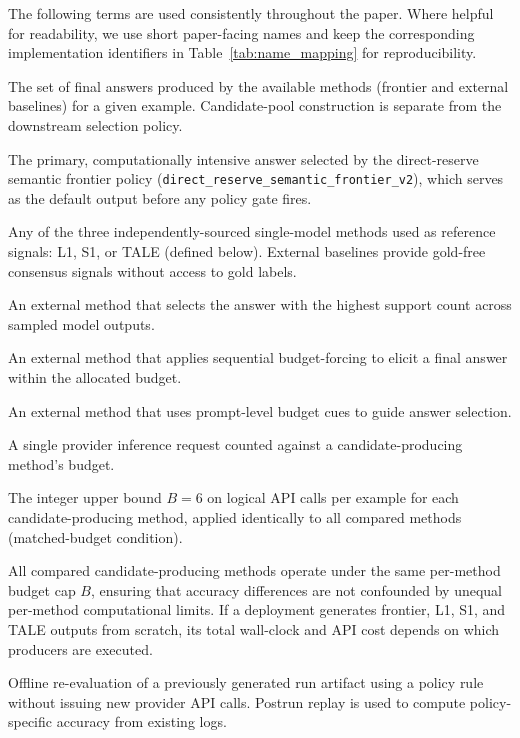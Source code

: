 The following terms are used consistently throughout the paper.
Where helpful for readability, we use short paper-facing names and keep the corresponding implementation identifiers in Table~\ref{tab:name_mapping} for reproducibility.

\begin{description}[leftmargin=2.2cm, labelwidth=2cm, labelsep=0.2cm, style=nextline]
  \item[Candidate pool] The set of final answers produced by the available methods (frontier and external baselines) for a given example. Candidate-pool construction is separate from the downstream selection policy.
  \item[Frontier method] The primary, computationally intensive answer selected by the direct-reserve semantic frontier policy (\texttt{direct\_reserve\_semantic\_frontier\_v2}), which serves as the default output before any policy gate fires.
  \item[External baseline] Any of the three independently-sourced single-model methods used as reference signals: L1, S1, or TALE (defined below). External baselines provide gold-free consensus signals without access to gold labels.
  \item[L1] An external method that selects the answer with the highest support count across sampled model outputs.
  \item[S1] An external method that applies sequential budget-forcing to elicit a final answer within the allocated budget.
  \item[TALE] An external method that uses prompt-level budget cues to guide answer selection.
  \item[Logical API call] A single provider inference request counted against a candidate-producing method's budget.
  \item[Budget] The integer upper bound $B = 6$ on logical API calls per example for each candidate-producing method, applied identically to all compared methods (matched-budget condition).
  \item[Matched budget] All compared candidate-producing methods operate under the same per-method budget cap $B$, ensuring that accuracy differences are not confounded by unequal per-method computational limits. If a deployment generates frontier, L1, S1, and TALE outputs from scratch, its total wall-clock and API cost depends on which producers are executed.
  \item[Postrun replay] Offline re-evaluation of a previously generated run artifact using a policy rule without issuing new provider API calls. Postrun replay is used to compute policy-specific accuracy from existing logs.

\end{description}
